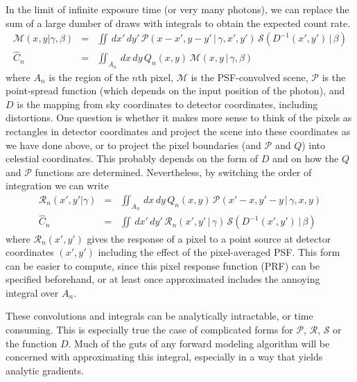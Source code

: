 \documentclass[modern]{aastex6}
\newcommand{\given}{\,|\,}
\newcommand{\countrate}{\hat{C}}
\newcommand{\model}{\mathcal{M}}
\newcommand{\psf}{\mathcal{P}}
\newcommand{\prf}{\mathcal{R}}
\newcommand{\qe}{Q}
\newcommand{\scene}{\mathcal{S}}
\begin{document}
In the limit of infinite exposure time (or very many photons), we can replace the sum of a large dumber of draws with integrals to obtain the expected count rate.
\begin{eqnarray}
\label{eqn:psf_convolve}
\model(x, y | \gamma, \beta) & = & \iint \, dx' \, dy' \, \psf(x - x', y-y' \given \gamma, x', y') \, \scene( D^{-1}(x', y') \given \beta) \\
\countrate_n & = & \iint_{A_n} \, dx \, dy \, \qe_n(x, y) \, \model(x, y \given \gamma, \beta) \nonumber
\end{eqnarray}
where $A_n$ is the region of the $n$th pixel, 
$\model$ is the PSF-convolved scene,
$\psf$ is the point-spread function (which depends on the input position of the photon),
and $D$ is the mapping from sky coordinates to detector coordinates, including distortions.
One question is whether it makes more sense to think of the pixels as rectangles in detector coordinates and project the scene into these coordinates as we have done above, 
or to project the pixel boundaries (and $\psf$ and $\qe$) into celestial coordinates.
This probably depends on the form of $D$ and on how the $\qe$ and $\psf$ functions are determined.
Nevertheless, by switching the order of integration we can write
\begin{eqnarray}
\label{eqn:prf_integral}
\prf_n(x', y' | \gamma) & = & \iint_{A_n} \, dx \, dy \, \qe_n(x, y) \, \psf(x' - x, y' - y \given \gamma, x, y) \\
\countrate_n & = & \iint \, dx' \, dy' \, \prf_n(x', y' \given \gamma) \, \scene( D^{-1}(x', y') \given \beta) \nonumber
\end{eqnarray}
where $\prf_n(x', y')$ gives the response of a pixel to a point source at detector coordinates $(x', y')$ including the effect of the pixel-averaged PSF.
This form can be easier to compute, since this pixel response function (PRF) can be specified beforehand, or at least once approximated includes the annoying integral over $A_n$.

These convolutions and integrals can be analytically intractable, or time consuming.
This is especially true the case of complicated forms for $\psf$, $\prf$, $\scene$ or the function $D$.
Much of the guts of any forward modeling algorithm will be concerned with approximating this integral,
 especially in a way that yields analytic gradients.
\end{document}
